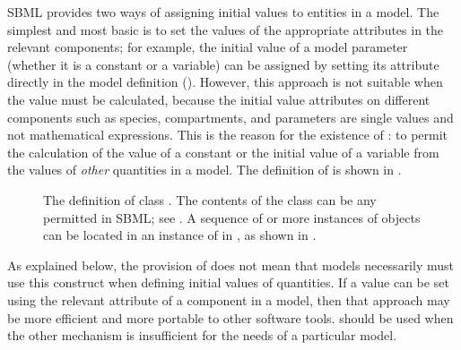 SBML \thisLV provides two ways of assigning initial values to
entities in a model.  The simplest and most basic is to set the
values of the appropriate attributes in the relevant
components; for example, the initial value of a model parameter
(whether it is a constant or a variable) can be assigned by
setting its  attribute directly in the model definition
().  However, this approach is not
suitable when the value must be calculated, because the initial
value attributes on different components such as species,
compartments, and parameters are single values and not
mathematical expressions.  This is the reason for the existence
of \InitialAssignment: to permit the calculation of the value of a
constant or the initial value of a variable from the values of
\emph{other} quantities in a model.  The definition of
\InitialAssignment is shown in .

\begin{figure}[htb]
  \centering
  \small
  \caption{The definition of class \InitialAssignment.  The
    contents of the \Math class can be any \mathml
    permitted in SBML; see
    \protect{}.  A
    sequence of  or more instances of \InitialAssignment
    objects can be located in an instance of
    \ListOfInitialAssignments in \Model, as shown in
    \protect{}.}
  \label{fig:initialAssignment}
\end{figure}

As explained below, the provision of \InitialAssignment does not
mean that models necessarily must use this construct when defining
initial values of quantities.  If a value can be set
using the relevant attribute of a component in a model, then
that approach may be more efficient and more portable to other
software tools.  \InitialAssignment should be used when the other
mechanism is insufficient for the needs of a particular model.

